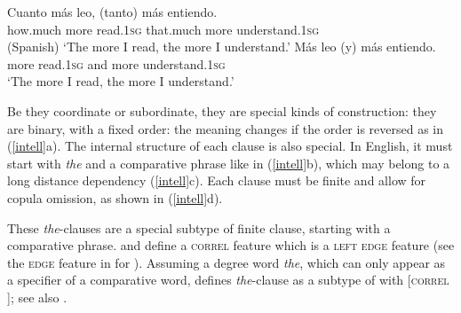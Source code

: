 {\begin{exe}
 \ex
\begin{xlista}
\ex 
\gll Cuanto   m\'{a}s leo,     (tanto)        m\'{a}s entiendo. \\
     how.much more    read.1\textsc{sg} that.much more understand.1\textsc{sg} \\\hfill{(Spanish)}
\glt `The more I read, the more I understand.'
\ex 
\gll	M\'{a}s leo        (y) m\'{a}s entiendo. \\
	more read.1\textsc{sg} and more understand.1\textsc{sg} \\
\glt `The more I read, the more I understand.'\\ 
 \citep[]{Abeille:Borsley:Espinal:06}
\end{xlista}\label{spanishab}
\end{exe}

Be they coordinate or subordinate, they are special kinds of construction: they are binary, with a fixed order: the meaning changes if the order is reversed
as in (\ref{intell}a).
The internal structure of each clause is also special. In English, it must start with \emph{the} and a comparative phrase like in (\ref{intell}b), which may belong to a long distance dependency 
(\ref{intell}c). Each clause must be finite and allow for copula omission, as shown in (\ref{intell}d).

\begin{exe}
 \ex
\begin{xlista}
\end{xlista}\label{intell}
\end{exe}

These \emph{the}-clauses  are a special subtype of finite clause, starting with a comparative
phrase. \citet[]{Abeille:Borsley:Espinal:06} and \citet[]{Borsley:11} 
define a \textsc{correl} feature which is a \textsc{left edge} feature (see the \textsc{edge}
feature in \citet{Bonami:2004} for  ).
 Assuming a degree word \textit{the}, which can only appear as a specifier of
a comparative word, \citet[]{Borsley:11}  defines \textit{the}-clause as a subtype of  with [\textsc{correl} ]; see also \citet[]{fgsag08}.

}
